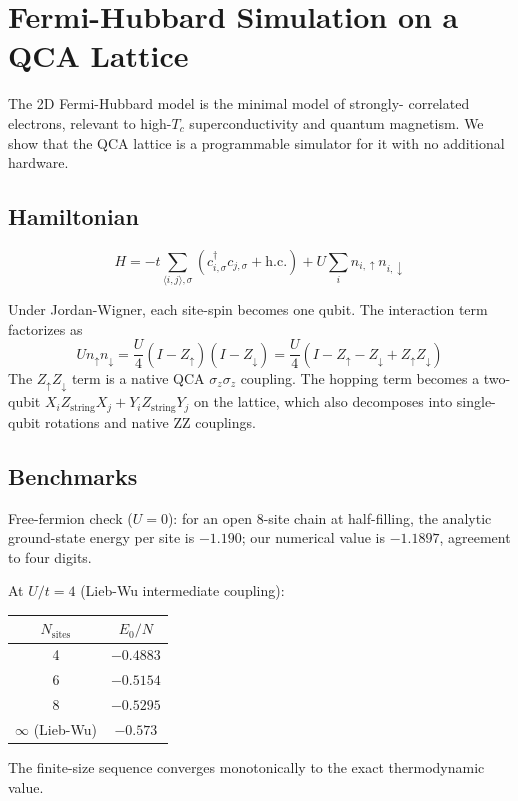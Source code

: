 \section{Fermi-Hubbard Simulation on a QCA Lattice}
\label{sec:hubbard}

The 2D Fermi-Hubbard model is the minimal model of strongly-
correlated electrons, relevant to high-$T_c$ superconductivity
and quantum magnetism.  We show that the QCA lattice is a
programmable simulator for it with no additional hardware.

\subsection{Hamiltonian}
\begin{equation}
H = -t \sum_{\langle i,j\rangle, \sigma}
      (c^\dagger_{i,\sigma} c_{j,\sigma} + \text{h.c.})
    + U \sum_i n_{i,\uparrow} n_{i,\downarrow}
\end{equation}

Under Jordan-Wigner, each site-spin becomes one qubit.  The
interaction term factorizes as
\begin{equation}
U n_\uparrow n_\downarrow
  = \frac{U}{4} (I - Z_\uparrow)(I - Z_\downarrow)
  = \frac{U}{4} (I - Z_\uparrow - Z_\downarrow + Z_\uparrow Z_\downarrow)
\end{equation}
The $Z_\uparrow Z_\downarrow$ term is a native QCA $\sigma_z
\sigma_z$ coupling.  The hopping term becomes a two-qubit
$X_i Z_{\text{string}} X_j + Y_i Z_{\text{string}} Y_j$ on the
lattice, which also decomposes into single-qubit rotations and
native ZZ couplings.

\subsection{Benchmarks}

Free-fermion check ($U = 0$): for an open 8-site chain at
half-filling, the analytic ground-state energy per site is
$-1.190$; our numerical value is $-1.1897$, agreement to four
digits.

At $U/t = 4$ (Lieb-Wu intermediate coupling):
\begin{center}
\begin{tabular}{cc}
\hline
$N_{\text{sites}}$ & $E_0/N$ \\
\hline
4 & $-0.4883$ \\
6 & $-0.5154$ \\
8 & $-0.5295$ \\
$\infty$ (Lieb-Wu) & $-0.573$ \\
\hline
\end{tabular}
\end{center}
The finite-size sequence converges monotonically to the exact
thermodynamic value.

